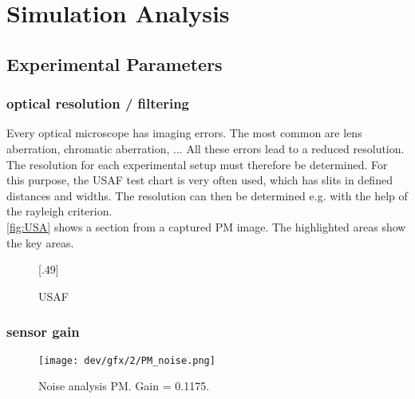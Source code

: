 \setcounter{chapter}{7}
\chapter{Simulation Analysis}
\label{cha:simulation_analysis}
% 
% 
% 
\section{Experimental Parameters}
% 
% 
% 
\subsection{optical resolution / filtering \opticsigma}
% 
Every optical microscope has imaging errors. The most common are lens aberration, chromatic aberration, ...
All these errors lead to a reduced resolution. The resolution for each experimental setup must therefore be determined. For this purpose, the USAF test chart is very often used, which has slits in defined distances and widths. The resolution can then be determined e.g. with the help of the rayleigh criterion.
% 
\\
% 
\cref{fig:USA} shows a section from a captured PM image. The highlighted areas show the key areas.
% 
\begin{figure}[!t]
\centering
{}[.49\textwidth]{
}
\caption{USAF}
\label{fig:USAF}
\end{figure}
% 
% 
% 
\subsection{sensor gain}
%
\begin{figure}[!t]
\centering
\texttt{[image: dev/gfx/2/PM\_noise.png]}
\caption{Noise analysis PM. Gain = 0.1175. }
\label{fig:parameterModelSimGain}
\end{figure}
% 
% 
% 
